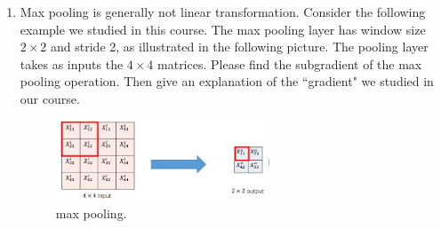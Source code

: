\documentclass[11pt,letter,notitlepage]{article}
\begin{document}
\begin{exercise}
\begin{enumerate}
\begin{enumerate}
          \item Max pooling is generally not linear transformation. Consider the following example we studied in this course. The max pooling layer has window size $2\times2$ and stride 2, as illustrated in the following picture. The pooling layer takes as inputs the $4\times4 $ matrices. Please find the subgradient of the max pooling operation. Then give an explanation of the ``gradient" we studied in our course.
          \begin{figure}[H]
              \centering
              \includegraphics[width=0.6\textwidth]{Figures/max_pooling.png}
              \caption{max pooling.}
            \end{figure}
        \end{enumerate}

\end{enumerate}

\end{exercise}
\begin{solution}

\end{solution}


\end{document}
